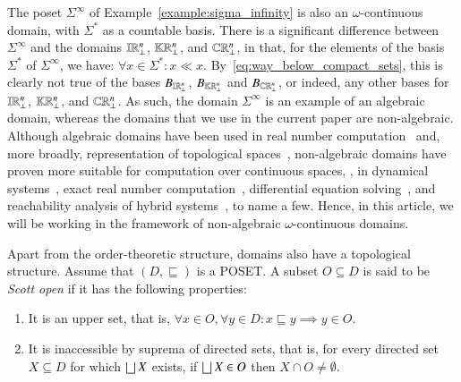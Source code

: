 \documentclass[11pt,times]{article}
\begin{document}
The poset $\Sigma^\infty$ of Example~\ref{example:sigma_infinity} is
also an $\omega$-continuous domain, with $\Sigma^*$ as a countable
basis. There is a significant difference between $\Sigma^\infty$ and
the domains $\intvaldom[\R^n\lift]$, $\kCPPO{\R^n\lift}$, and
$\cCPPO{\R^n\lift}$, in that, for the elements of the basis $\Sigma^*$
of $\Sigma^\infty$, we have: $\forall x \in \Sigma^*: x \ll
x$. By~\eqref{eq:way_below_compact_sets}, this is clearly not true of
the bases $B_{\intvaldom[\R^n\lift]}$, $B_{\kCPPO{\R^n\lift}}$ and
$B_{\cCPPO{\R^n\lift}}$, or indeed, any other bases for
$\intvaldom[\R^n\lift]$, $\kCPPO{\R^n\lift}$, and
$\cCPPO{\R^n\lift}$. As such, the domain $\Sigma^\infty$ is an example
of an algebraic domain, whereas the domains that we use in the current
paper are non-algebraic. Although algebraic domains have been used in
real number
computation~\parencite{DiGianantonio:Real_Domain:IC:1996,Farjudian:Shrad:2007}
and, more broadly, representation of topological
spaces~\parencite{StoltenbergHansen_Tucker:Effective_Algebras:1995,StoltenbergHansen_Tucker:topological_algebras:1999},
non-algebraic domains have proven more suitable for computation over
continuous spaces, {\eg}, in dynamical
systems~\parencite{Edalat95:DT-fractals}, exact real number
computation~\parencite{Escardo96-tcs,Edalat:Domains_Physics:1997},
differential equation
solving~\parencite{Edalat_Pattinson2007-LMS_Picard,Edalat_Farjudian_Mohammadian_Pattinson:2nd_Order_Euler:2020:Conf},
and reachability analysis of hybrid
systems~\parencite{Edalat_Pattinson:Hybrid:2007,Moggi_Farjudian_Duracz_Taha:Reachability_Hybrid:2018},
to name a few. Hence, in this article, we will be working in the
framework of non-algebraic $\omega$-continuous domains.



Apart from the order-theoretic structure, domains also have a
topological structure. Assume that $(D, \sqsubseteq)$ is a
\ac{POSET}. A subset $O \subseteq D$ is said to be \emph{Scott open}
if it has the following properties:
  \begin{enumerate}[label=(\arabic*)]
  \item It is an upper set, that is,
    $\forall x \in O, \forall y \in D: x \sqsubseteq y \implies y \in
    O$.
  \item It is inaccessible by suprema of directed sets, that is, for
    every directed set $X \subseteq D$ for which $\lub X$ exists, if
    $\lub X \in O$ then $X \cap O \neq \emptyset$.
  \end{enumerate}
\end{document}
